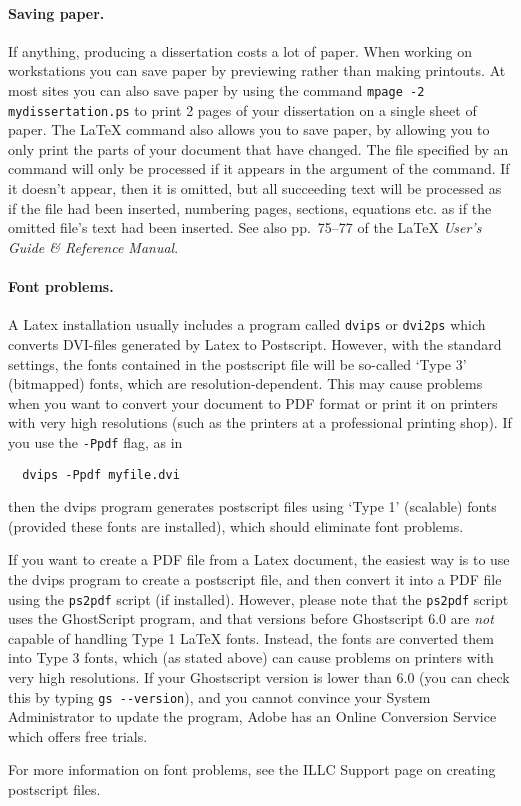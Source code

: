 \paragraph*{Saving paper.}
If anything, producing a dissertation costs a lot of paper.
When working on workstations you can save paper by previewing
rather than making printouts. At most sites you can also
save paper by using the command {\tt mpage -2 mydissertation.ps}
to print 2 pages of your dissertation on a single sheet of paper.
The \LaTeX{} command \verb||
also allows you to save paper,
by allowing you to only print the parts of your document that have changed.
The file specified by an \verb|| command will only be processed if
it appears in the argument of the \verb|| command.
If it doesn't appear, then it is omitted, but all succeeding text will be
processed as if the file had been inserted, numbering pages, sections,
equations etc. as if the omitted file's text had been inserted.
See also pp.~75--77 of the \LaTeX{} {\em User's Guide \& Reference Manual\/}.

\paragraph*{Font problems.}
A Latex installation usually includes a program called 
\verb|dvips| or \verb|dvi2ps|
which converts DVI-files generated by Latex to Postscript.
However, with the standard settings, the fonts contained
in the postscript file will be so-called `Type 3' (bitmapped) fonts, 
which are resolution-dependent. This may cause problems when you want 
to convert your document to PDF format or print it on printers with
very high resolutions (such as the printers at a professional printing
shop).
If you use the \verb|-Ppdf| flag, as in
\begin{verbatim}
  dvips -Ppdf myfile.dvi
\end{verbatim}
then the dvips program generates postscript files using
`Type 1' (scalable) fonts (provided these fonts are installed),
which should eliminate font problems.

If you want to create a PDF file from a Latex document, the easiest way is 
to use the dvips program to create a postscript file, and then convert
it into a PDF file using the \verb|ps2pdf| script (if installed). 
However, please note that
the \verb|ps2pdf| script uses the GhostScript program, and that versions
before Ghostscript 6.0 are \emph{not} capable of handling Type 1
LaTeX fonts. Instead, the fonts are converted them into Type 3 fonts, 
which (as stated above) can cause problems on printers with very high
resolutions. If your Ghostscript version is lower than 6.0
(you can check this by typing \verb|gs --version|),
and you cannot convince your System Administrator to update the
program, 
Adobe has an Online Conversion Service which offers free trials.

For more information on font problems, 
see the ILLC Support page on creating postscript files.
